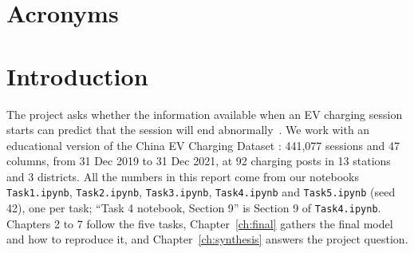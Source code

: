 \documentclass[12pt,a4paper,openany]{report}
\begin{document}
\chapter*{Acronyms}
\begin{acronym}
\end{acronym}

\cleardoublepage
{}

\makeatletter
{}
\renewcommand{\@makechapterhead}[1]{{\parindent\z@\raggedright\normalfont
  \LARGE\bfseries\thechapter\quad #1\par\nobreak\vskip 12\p@}}
\makeatother

\chapter{Introduction}\label{ch:intro}

The project asks whether the information available when an \ac{EV} charging session starts can predict that the
session will end abnormally~\cite{brief}. We work with an educational version of the China EV Charging Dataset
\cite{zhang2025}: 441,077 sessions and 47 columns, from 31 Dec 2019 to 31 Dec 2021, at 92 charging posts in 13
stations and 3 districts. All the numbers in this report come from our notebooks
\nolinkurl{Task1.ipynb}, \nolinkurl{Task2.ipynb}, \nolinkurl{Task3.ipynb}, \nolinkurl{Task4.ipynb} and
\nolinkurl{Task5.ipynb} (seed 42), one per task; ``Task 4 notebook, Section 9'' is Section 9 of
\nolinkurl{Task4.ipynb}. Chapters 2 to 7 follow the five tasks, Chapter~\ref{ch:final} gathers the final
model and how to reproduce it, and Chapter~\ref{ch:synthesis} answers the project question.
\end{document}
